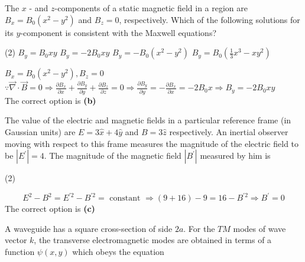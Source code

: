 \begin{enumerate}
\begin{answer}
\end{answer}
\begin{minipage}{\textwidth}
	\item The $x$ - and $z$-components of a static magnetic field in a region are $B_{x}=B_{0}\left(x^{2}-y^{2}\right)$ and $B_{z}=0$, respectively. Which of the following solutions for its $y$-component is consistent with the Maxwell equations?
\end{minipage}
\begin{tasks}(2)
	\task[\textbf{A.}] $B_{y}=B_{0} x y$
	\task[\textbf{B.}]$B_{y}=-2 B_{0} x y$
	\task[\textbf{C.}]$B_{y}=-B_{0}\left(x^{2}-y^{2}\right)$
	\task[\textbf{D.}] $B_{y}=B_{0}\left(\frac{1}{3} x^{3}-x y^{2}\right)$
\end{tasks}
\begin{answer}
	$B_{x}=B_{0}\left(x^{2}-y^{2}\right), B_{z}=0$\\
	$\because \vec{\nabla} \cdot \vec{B}=0 \Rightarrow \frac{\partial B_{x}}{\partial x}+\frac{\partial B_{y}}{\partial y}+\frac{\partial B_{z}}{\partial z}=0 \Rightarrow \frac{\partial B_{y}}{\partial y}=-\frac{\partial B_{x}}{\partial x}=-2 B_{0} x \Rightarrow B_{y}=-2 B_{0} x y$	\\
	The correct option is \textbf{(b)}
\end{answer}
\begin{minipage}{\textwidth}
	\item The value of the electric and magnetic fields in a particular reference frame (in Gaussian units) are $E=3 \hat{x}+4 \hat{y}$ and $B=3 \hat{z}$ respectively. An inertial observer moving with respect to this frame measures the magnitude of the electric field to be $\left|E^{\prime}\right|=4$. The magnitude of the magnetic field $\left|B^{\prime}\right|$ measured by him is
\end{minipage}
\begin{tasks}(2)
\end{tasks}
\begin{answer}
	$$ E^{2}-B^{2}=E^{\prime 2}-B^{\prime 2}=\text { constant } \Rightarrow(9+16)-9=16-B^{\prime 2} \Rightarrow B^{\prime}=0$$
	The correct option is \textbf{(c)}	
\end{answer}
\begin{minipage}{\textwidth}
	\item A waveguide has a square cross-section of side $2 a$. For the $T M$ modes of wave vector $k$, the transverse electromagnetic modes are obtained in terms of a function $\psi(x, y)$ which obeys the equation

\end{minipage}
\end{enumerate}

